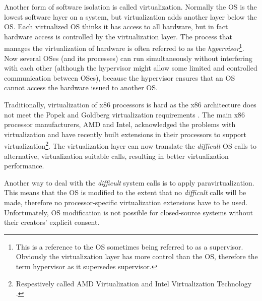 Another form of software isolation is called virtualization. Normally the OS is the lowest software layer on a system, but virtualization adds another layer below the OS. Each virtualized OS thinks it has access to all hardware, but in fact hardware access is controlled by the virtualization layer. The process that manages the virtualization of hardware is often referred to as the \textsl{hypervisor}\footnote{This is a reference to the OS sometimes being referred to as a supervisor. Obviously the virtualization layer has more control than the OS, therefore the term hypervisor as it supersedes supervisor.}. Now several OSes (and its processes) can run simultaneously without interfering with each other (although the hypervisor might allow some limited and controlled communication between OSes), because the hypervisor ensures that an OS cannot access the hardware issued to another OS.\emptyline

Traditionally, virtualization of x86 processors is hard as the x86 architecture does not meet the Popek and Goldberg virtualization requirements \cite{popek74formal}. The main x86 processor manufacturers, AMD and Intel, acknowledged the problems with virtualization and have recently built extensions in their processors to support virtualization\footnote{Respestively called AMD Virtualization \cite{amd05virtual} and Intel Virtualization Technology \cite{intel05virtual}.}. The virtualization layer can now translate the \textit{difficult} OS calls to alternative, virtualization suitable calls, resulting in better virtualization performance.\emptyline

Another way to deal with the \textit{difficult} system calls is to apply paravirtualization. This means that the OS is modified to the extent that no \textit{difficult} calls will be made, therefore no processor-specific virtualization extensions have to be used. Unfortunately, OS modification is not possible for closed-source systems without their creators' explicit consent.